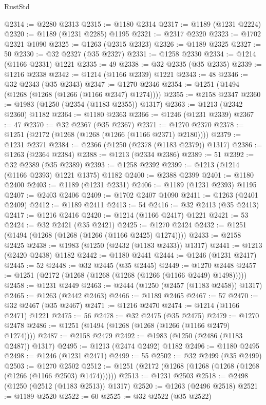 \begin{lexlean}{RustStd}
\begin{coremodule}
@2314 := @2280 @2313
@2315 := @1180 @2314
@2317 := @1189 (@1231 @2224)
@2320 := @1189 (@1231 @2285) @1195
@2321 := @2317 @2320
@2323 := @1702 @2321 @1090
@2325 := @1263 (@2315 @2323)
@2326 := @1189 @2325
@2327 := 50
@2330 := @32 @2327 (@35 @2327)
@2331 := @1258 @2330
@2334 := @1214 (@1166 @2331) @1221
@2335 := 49
@2338 := @32 @2335 (@35 @2335)
@2339 := @1216 @2338
@2342 := @1214 (@1166 @2339) @1221
@2343 := 48
@2346 := @32 @2343 (@35 @2343)
@2347 := @1270 @2346
@2354 := @1251 (@1494 (@1268 (@1268 (@1266 (@1166 @2347) @1274))))
@2355 := @2158 @2347
@2360 := @1983 (@1250 (@2354 (@1183 @2355)) @1317)
@2363 := @1213 (@2342 @2360) @1182
@2364 := @1180 @2363
@2366 := @1246 (@1231 @2339)
@2367 := 47
@2370 := @32 @2367 (@35 @2367)
@2371 := @1270 @2370
@2378 := @1251 (@2172 (@1268 (@1268 (@1266 (@1166 @2371) @2180))))
@2379 := @1231 @2371
@2384 := @2366 (@1250 (@2378 (@1183 @2379)) @1317)
@2386 := @1263 (@2364 @2384)
@2388 := @1213 (@2334 @2386)
@2389 := 51
@2392 := @32 @2389 (@35 @2389)
@2393 := @1258 @2392
@2399 := @1213 (@1214 (@1166 @2393) @1221 @1375) @1182
@2400 := @2388 @2399
@2401 := @1180 @2400
@2403 := @1189 (@1231 @2331)
@2406 := @1189 (@1231 @2393) @1195
@2407 := @2403 @2406
@2409 := @1702 @2407 @1090
@2411 := @1263 (@2401 @2409)
@2412 := @1189 @2411
@2413 := 54
@2416 := @32 @2413 (@35 @2413)
@2417 := @1216 @2416
@2420 := @1214 (@1166 @2417) @1221
@2421 := 53
@2424 := @32 @2421 (@35 @2421)
@2425 := @1270 @2424
@2432 := @1251 (@1494 (@1268 (@1268 (@1266 (@1166 @2425) @1274))))
@2433 := @2158 @2425
@2438 := @1983 (@1250 (@2432 (@1183 @2433)) @1317)
@2441 := @1213 (@2420 @2438) @1182
@2442 := @1180 @2441
@2444 := @1246 (@1231 @2417)
@2445 := 52
@2448 := @32 @2445 (@35 @2445)
@2449 := @1270 @2448
@2457 := @1251 (@2172 (@1268 (@1268 (@1268 (@1266 (@1166 @2449) @1498)))))
@2458 := @1231 @2449
@2463 := @2444 (@1250 (@2457 (@1183 @2458)) @1317)
@2465 := @1263 (@2442 @2463)
@2466 := @1189 @2465
@2467 := 57
@2470 := @32 @2467 (@35 @2467)
@2471 := @1216 @2470
@2474 := @1214 (@1166 @2471) @1221
@2475 := 56
@2478 := @32 @2475 (@35 @2475)
@2479 := @1270 @2478
@2486 := @1251 (@1494 (@1268 (@1268 (@1266 (@1166 @2479) @1274))))
@2487 := @2158 @2479
@2492 := @1983 (@1250 (@2486 (@1183 @2487)) @1317)
@2495 := @1213 (@2474 @2492) @1182
@2496 := @1180 @2495
@2498 := @1246 (@1231 @2471)
@2499 := 55
@2502 := @32 @2499 (@35 @2499)
@2503 := @1270 @2502
@2512 := @1251 (@2172 (@1268 (@1268 (@1268 (@1268 (@1266 (@1166 @2503) @1474))))))
@2513 := @1231 @2503
@2518 := @2498 (@1250 (@2512 (@1183 @2513)) @1317)
@2520 := @1263 (@2496 @2518)
@2521 := @1189 @2520
@2522 := 60
@2525 := @32 @2522 (@35 @2522)

\end{coremodule}
\end{lexlean}

